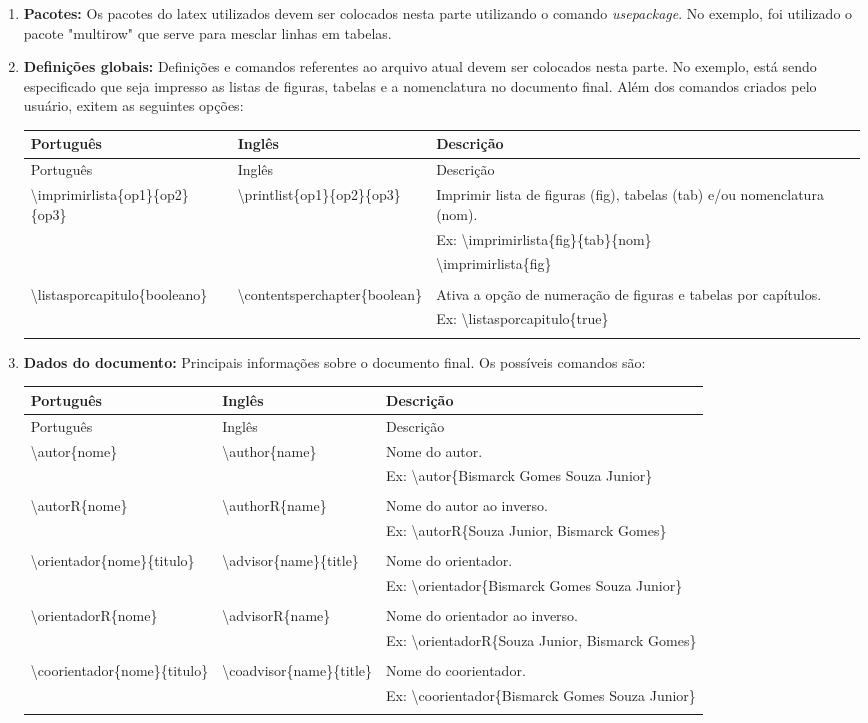 \documentclass{book}
\newcommand{\bs}{\textbackslash}
\newcommand{\nl}{\\ & &}
\newcommand{\newrow}[4]{
  \bs #1 & \bs #2 & #3 \nl
                    #4 \nl \\
}
\newenvironment{mytable}{
\begin{longtable}{ p{4.8cm} p{4.3cm} p{8cm} }

\hline
  Português      & Inglês     & Descrição  \\
  \hline
\endfirsthead

\hline
  Português      & Inglês     & Descrição  \\
  \hline
\endhead

\hline
\endfoot
}{
\end{longtable}
}
\begin{document}
\begin{enumerate}
      \item \textbf{Pacotes:} Os pacotes do latex utilizados devem ser colocados nesta parte utilizando o comando \textit{usepackage}. No exemplo, foi utilizado o pacote "multirow" que serve para mesclar linhas em tabelas.

      \item \textbf{Definições globais:} Definições e comandos referentes ao arquivo atual devem ser colocados nesta parte. No exemplo, está sendo especificado que seja impresso as listas de figuras, tabelas e a nomenclatura no documento final. Além dos comandos criados pelo usuário, exitem as seguintes opções:

      \begin{mytable}
        \newrow{imprimirlista\{op1\}\{op2\}\{op3\}}{printlist\{op1\}\{op2\}\{op3\}}
               {Imprimir lista de figuras (fig), tabelas (tab) e/ou nomenclatura (nom).}
               {Ex: \bs imprimirlista\{fig\}\{tab\}\{nom\}\nl
               \hspace{1.6em} \bs imprimirlista\{fig\}}
               
        \newrow{listasporcapitulo\{booleano\}}{contentsperchapter\{boolean\}}
               {Ativa a opção de numeração de figuras e tabelas por capítulos.}
               {Ex: \bs listasporcapitulo\{true\}}
      \end{mytable}


      \item \textbf{Dados do documento:} Principais informações sobre o documento final. Os possíveis comandos são:

  \begin{mytable}
    
    \newrow{autor\{nome\}}{author\{name\}}
           {Nome do autor.}
           {Ex: \bs autor\{Bismarck Gomes Souza Junior\}}
           
    \newrow{autorR\{nome\}}{authorR\{name\}}
           {Nome do autor ao inverso.}
           {Ex: \bs autorR\{Souza Junior, Bismarck Gomes\}}
           
    \newrow{orientador\{nome\}\{titulo\}}{advisor\{name\}\{title\}}
           {Nome do orientador.}
           {Ex: \bs orientador\{Bismarck Gomes Souza Junior\}}
           
    \newrow{orientadorR\{nome\}}{advisorR\{name\}}
           {Nome do orientador ao inverso.}
           {Ex: \bs orientadorR\{Souza Junior, Bismarck Gomes\}}
           
    \newrow{coorientador\{nome\}\{titulo\}}{coadvisor\{name\}\{title\}}
           {Nome do coorientador.}
           {Ex: \bs coorientador\{Bismarck Gomes Souza Junior\}}
           

\end{mytable}
\end{enumerate}
\end{document}
